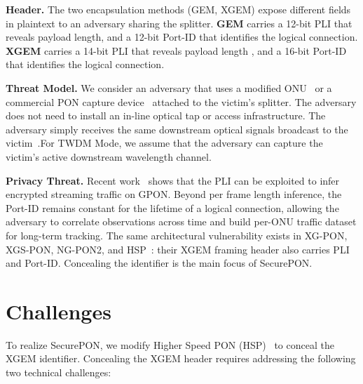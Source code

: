 \documentclass[sigconf]{acmart}
\begin{document}

\smallskip
\noindent\textbf{Header.}
The two encapsulation methods (GEM, XGEM) expose different fields in plaintext to an adversary 
sharing the splitter. 
\textbf{GEM} carries a 12-bit PLI that reveals payload length, and a 12-bit Port-ID that identifies the logical connection.
\textbf{XGEM} carries a 14-bit PLI that reveals payload length , and a 16-bit Port-ID that identifies the logical connection.



\noindent\textbf{Threat Model.} We consider an adversary that uses a modified ONU~\cite[\S Section 12.1: Basic threat model, \S15.1]{itu-g9843,itu-50GPON} or a commercial PON capture device~\cite{MT2} attached to the victim's splitter. The adversary does not need to install an in-line optical tap or access infrastructure. The adversary simply receives the same downstream optical signals broadcast to the victim~\cite{PLI}.For TWDM Mode, we assume that the adversary can capture the victim's active downstream wavelength channel.



\smallskip
\noindent\textbf{Privacy Threat.} Recent work~\cite{PLI} shows that the PLI can be exploited to 
infer encrypted streaming traffic on GPON. Beyond per frame length inference, the Port-ID remains constant for the lifetime of a logical connection, allowing the adversary to correlate observations across time and build per-ONU traffic dataset for long-term tracking. The same architectural vulnerability exists in XG-PON, XGS-PON, NG-PON2, and HSP~\cite{itu-XGPON,itu-XGSPON,itu-NGPON2,itu-50GPON}: their XGEM framing header also carries PLI and Port-ID. Concealing the identifier is the main focus of SecurePON.



\section{Challenges}
To realize SecurePON, we modify Higher Speed PON (HSP)~\cite{itu-50GPON} to conceal the XGEM identifier. Concealing the XGEM header requires addressing the following two technical challenges:
\end{document}
